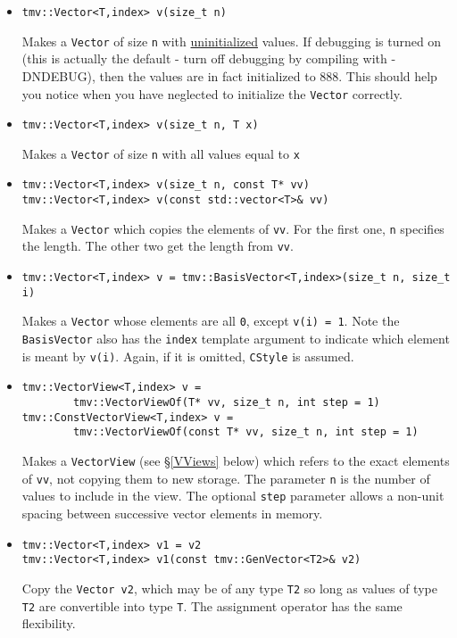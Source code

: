 \documentclass[twoside,letterpaper,11pt]{article}
\renewcommand{\tt}[1]{{\texttt {#1}}}
\begin{document}
\begin{itemize}
\item 
\begin{verbatim}
tmv::Vector<T,index> v(size_t n)
\end{verbatim}
Makes a \tt{Vector} of size \tt{n} with \underline{uninitialized} values.
If debugging is turned on (this is actually the default - 
turn off debugging by compiling
with -DNDEBUG), then the values are in fact initialized to 888.  
This should help you notice
when you have neglected to initialize the \tt{Vector} correctly.

\item
\begin{verbatim}
tmv::Vector<T,index> v(size_t n, T x)
\end{verbatim}
Makes a \tt{Vector} of size \tt{n} with all values equal to \tt{x}

\item
\begin{verbatim}
tmv::Vector<T,index> v(size_t n, const T* vv)
tmv::Vector<T,index> v(const std::vector<T>& vv)
\end{verbatim}
Makes a \tt{Vector} which copies the elements of \tt{vv}.
For the first one, \tt{n} specifies the length.  The other two get
the length from \tt{vv}.

\item
\begin{verbatim}
tmv::Vector<T,index> v = tmv::BasisVector<T,index>(size_t n, size_t i)
\end{verbatim}
Makes a \tt{Vector} whose elements are all \tt{0}, except \tt{v(i) = 1}.
Note the \tt{BasisVector} also has the \tt{index} template argument to 
indicate which element is meant by \tt{v(i)}.  Again, if it is omitted,
\tt{CStyle} is assumed.

\item
\begin{verbatim}
tmv::VectorView<T,index> v = 
        tmv::VectorViewOf(T* vv, size_t n, int step = 1)
tmv::ConstVectorView<T,index> v = 
        tmv::VectorViewOf(const T* vv, size_t n, int step = 1)
\end{verbatim}
Makes a \tt{VectorView} (see \S\ref{VViews} below) which refers to the exact
elements of \tt{vv}, not copying them to new storage.  The parameter \tt{n}
is the number of values to include in the view.
The optional \tt{step} parameter allows a non-unit spacing between 
successive vector elements in memory. 

\item
\begin{verbatim}
tmv::Vector<T,index> v1 = v2
tmv::Vector<T,index> v1(const tmv::GenVector<T2>& v2)
\end{verbatim}
Copy the \tt{Vector v2}, which may be of any type \tt{T2} so long
as values of type \tt{T2} are convertible into type \tt{T}.
The assignment operator has the same flexibility.

\end{itemize}
\end{document}
